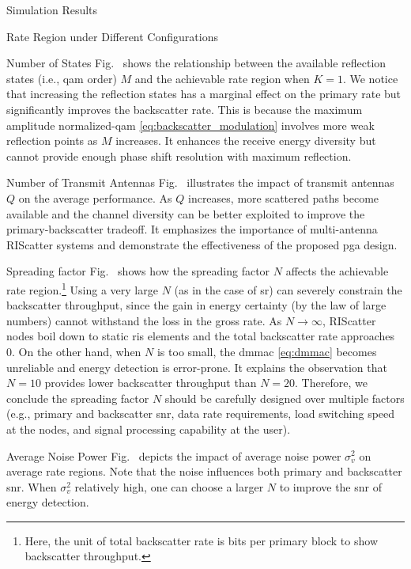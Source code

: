 \begin{section}{Simulation Results}
\begin{subsection}{Rate Region under Different Configurations}
		\begin{subsubsection}{Number of States}
			Fig.~ shows the relationship between the available reflection states (i.e., \gls{qam} order) $M$ and the achievable rate region when $K=1$.
			We notice that increasing the reflection states has a marginal effect on the primary rate but significantly improves the backscatter rate.
			This is because the maximum amplitude normalized-\gls{qam} \eqref{eq:backscatter_modulation} involves more weak reflection points as $M$ increases.
			It enhances the receive energy diversity but cannot provide enough phase shift resolution with maximum reflection.
		\end{subsubsection}

		\begin{subsubsection}{Number of Transmit Antennas}
			Fig.~ illustrates the impact of transmit antennas $Q$ on the average performance.
			As $Q$ increases, more scattered paths become available and the channel diversity can be better exploited to improve the primary-backscatter tradeoff.
			It emphasizes the importance of multi-antenna RIScatter systems and demonstrate the effectiveness of the proposed \gls{pga} design.
		\end{subsubsection}

		\begin{subsubsection}{Spreading factor}
			Fig.~ shows how the spreading factor $N$ affects the achievable rate region.\footnote{Here, the unit of total backscatter rate is bits per primary block to show backscatter throughput.}
			Using a very large $N$ (as in the case of \gls{sr}) can severely constrain the backscatter throughput, since the gain in energy certainty (by the law of large numbers) cannot withstand the loss in the gross rate.
			As $N \to \infty$, RIScatter nodes boil down to static \gls{ris} elements and the total backscatter rate approaches \num{0}.
			On the other hand, when $N$ is too small, the \gls{dmmac} \eqref{eq:dmmac} becomes unreliable and energy detection is error-prone.
			It explains the observation that $N=10$ provides lower backscatter throughput than $N=20$.
			Therefore, we conclude the spreading factor $N$ should be carefully designed over multiple factors (e.g., primary and backscatter \gls{snr}, data rate requirements, load switching speed at the nodes, and signal processing capability at the user).
		\end{subsubsection}

		\begin{subsubsection}{Average Noise Power}
			Fig.~ depicts the impact of average noise power $\sigma_v^2$ on average rate regions.
			Note that the noise influences both primary and backscatter \gls{snr}.
			When $\sigma_v^2$ relatively high, one can choose a larger $N$ to improve the \gls{snr} of energy detection.
		\end{subsubsection}


\end{subsection}
\end{section}
